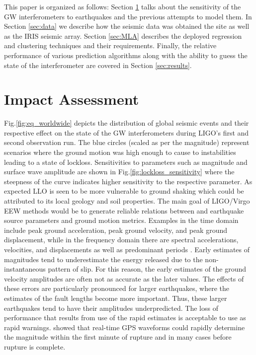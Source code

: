 \documentclass[reprint, prl, aps, showpacs]{revtex4-1}
\begin{document}
This paper is organized as follows: Section \ref{sec:motivation} talks about the sensitivity of the GW interferometers to earthquakes and the previous attempts to model them. In Section \ref{sec:data} we describe how the seismic data was obtained the site as well as the IRIS seismic array. Section \ref{sec:MLA} describes the deployed regression and clustering techniques and their requirements. Finally, the relative performance of various prediction algorithms along with the ability to guess the state of the interferometer are covered in Section \ref{sec:results}.

\section{Impact Assessment}\label{sec:motivation}
Fig.\ref{fig:eq_worldwide} depicts the distribution of global seismic events and their respective effect on the state of the GW interferometers during LIGO's first and second observation run. The blue circles (scaled as per the magnitude) represent scenarios where the ground motion was high enough to cause to instabilities leading to a state of lockloss. Sensitivities to parameters such as magnitude and surface wave amplitude are shown in Fig.\ref{fig:lockloss_sensitivity} where the steepness of the curve indicates higher sensitivity to the respective parameter. As expected LLO is seen to be more vulnerable to ground shaking which could be attributed to its local geology and soil properties.
The main goal of LIGO/Virgo EEW methods would be to generate reliable relations between and earthquake source parameters and ground motion metrics. Examples in the time domain include peak ground acceleration, peak ground velocity, and peak
ground displacement, while in the frequency domain there are spectral accelerations, velocities, and displacements as well as predominant periods \cite{Do2003}.  Early estimates of magnitudes tend to underestimate the energy released due to the non-instantaneous pattern of slip.
For this reason, the early estimates of the ground velocity amplitudes are often not as accurate as the later values. 
The effects of these errors are particularly pronounced for larger earthquakes, where the estimates of the fault lengths become more important.
Thus, these larger earthquakes tend to have their amplitudes underpredicted.
The loss of performance that results from use of the rapid estimates is acceptable to use as rapid warnings.
\cite{MeCr2015} showed that real-time GPS waveforms could rapidly determine the magnitude within the first minute of rupture and in many cases before rupture is complete.
\end{document}

